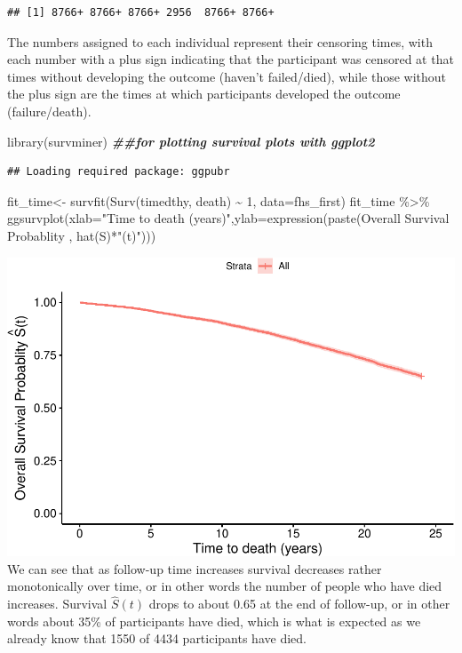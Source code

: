 \documentclass[
]{book}
\newenvironment{Shaded}{\begin{snugshade}}{\end{snugshade}}
\newcommand{\AttributeTok}[1]{\textcolor[rgb]{0.77,0.63,0.00}{#1}}
\newcommand{\DecValTok}[1]{\textcolor[rgb]{0.00,0.00,0.81}{#1}}
\newcommand{\DocumentationTok}[1]{\textcolor[rgb]{0.56,0.35,0.01}{\textbf{\textit{#1}}}}
\newcommand{\FunctionTok}[1]{\textcolor[rgb]{0.00,0.00,0.00}{#1}}
\newcommand{\NormalTok}[1]{#1}
\newcommand{\OtherTok}[1]{\textcolor[rgb]{0.56,0.35,0.01}{#1}}
\newcommand{\SpecialCharTok}[1]{\textcolor[rgb]{0.00,0.00,0.00}{#1}}
\newcommand{\StringTok}[1]{\textcolor[rgb]{0.31,0.60,0.02}{#1}}
\begin{document}
\begin{verbatim}
## [1] 8766+ 8766+ 8766+ 2956  8766+ 8766+
\end{verbatim}

The numbers assigned to each individual represent their censoring times, with each number with a plus sign indicating that the participant was censored at that times without developing the outcome (haven't failed/died), while those without the plus sign are the times at which participants developed the outcome (failure/death).

\begin{Shaded}
\begin{Highlighting}[]
\FunctionTok{library}\NormalTok{(survminer) }\DocumentationTok{\#\#for plotting survival plots with ggplot2}
\end{Highlighting}
\end{Shaded}

\begin{verbatim}
## Loading required package: ggpubr
\end{verbatim}

\begin{Shaded}
\begin{Highlighting}[]
\NormalTok{fit\_time}\OtherTok{\textless{}{-}}  \FunctionTok{survfit}\NormalTok{(}\FunctionTok{Surv}\NormalTok{(timedthy, death) }\SpecialCharTok{\textasciitilde{}} \DecValTok{1}\NormalTok{, }\AttributeTok{data=}\NormalTok{fhs\_first)}
\NormalTok{fit\_time }\SpecialCharTok{\%\textgreater{}\%}
\FunctionTok{ggsurvplot}\NormalTok{(}\AttributeTok{xlab=}\StringTok{"Time to death (years)"}\NormalTok{,}\AttributeTok{ylab=}\FunctionTok{expression}\NormalTok{(}\FunctionTok{paste}\NormalTok{(}\StringTok{\textquotesingle{}Overall Survival Probablity \textquotesingle{}}\NormalTok{, }\FunctionTok{hat}\NormalTok{(S)}\SpecialCharTok{*}\StringTok{"(t)"}\NormalTok{)))}
\end{Highlighting}
\end{Shaded}

\includegraphics{adv_epi_analysis_files/figure-latex/unnamed-chunk-194-1.pdf}
We can see that as follow-up time increases survival decreases rather monotonically over time, or in other words the number of people who have died increases. Survival \(\hat{S}(t)\) drops to about 0.65 at the end of follow-up, or in other words about 35\% of participants have died, which is what is expected as we already know that 1550 of 4434 participants have died.
\end{document}
